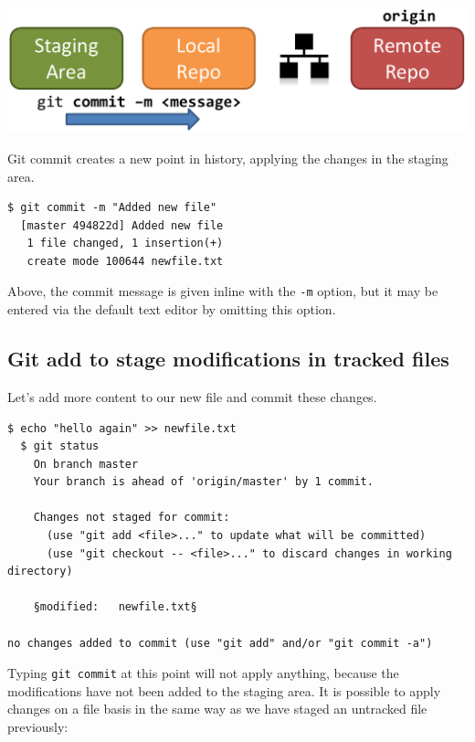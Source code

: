 \documentclass{tufte-handout}
\begin{document}
\begin{marginfigure}%
  \centering
  \includegraphics[width=\linewidth]{gitcommit-schema.pdf}
  \label{fig:gitcommit}
  \caption{Git commit creates a new point in history, applying the changes in the staging area.}
\end{marginfigure}

\begin{lstlisting}[style=BashInputStyle]
  $ git commit -m "Added new file"
  [master 494822d] Added new file
   1 file changed, 1 insertion(+)
   create mode 100644 newfile.txt
\end{lstlisting}

Above, the commit message is given inline with the \texttt{-m} option, but it may be entered via the default text editor by omitting this option.

\subsection{Git add to stage modifications in tracked files}

Let's add more content to our new file and commit these changes.

\begin{lstlisting}[style=BashInputStyle]
  $ echo "hello again" >> newfile.txt
  $ git status
    On branch master
    Your branch is ahead of 'origin/master' by 1 commit.
  
    Changes not staged for commit:
      (use "git add <file>..." to update what will be committed)
      (use "git checkout -- <file>..." to discard changes in working directory)
   
    §modified:   newfile.txt§
   
no changes added to commit (use "git add" and/or "git commit -a")
\end{lstlisting}

Typing \texttt{git commit} at this point will not apply anything, because the modifications have not been added to the staging area.
It is possible to apply changes on a file basis in the same way as we have staged an untracked file previously:
\end{document}
